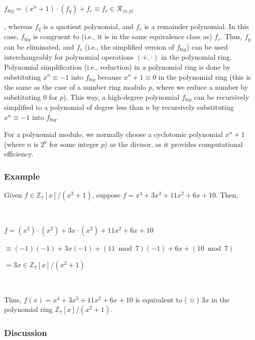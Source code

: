 $f_{big} = (x^n + 1)\cdot(f_q) + f_r \equiv f_r \in \mathcal{R}_{\langle n, p \rangle}$

\noindent, whereas $f_q$ is a quotient polynomial, and $f_r$ is a remainder polynomial. In this case, $f_{big}$ is congruent to (i.e., it is in the same equivalence class as) $f_r$. Thus, $f_q$ can be eliminated, and $f_r$ (i.e., the simplified version of $f_{big}$) can be used interchangeably for polynomial operations $(+, \cdot)$ in the polynomial ring. 
Polynomial simplification (i.e., reduction) in a polynomial ring is done by substituting $x^n \equiv -1$ into $f_{big}$ because $x^n + 1 \equiv 0$ in the polynomial ring (this is the same as the case of a number ring modulo $p$, where we reduce a number by substituting $0$ for $p$). This way, a high-degree polynomial $f_{big}$ can be recursively simplified to a polynomial of degree less than $n$ by recursively substituting $x^n \equiv -1$ into $f_{big}$.

For a polynomial modulo, we normally choose a cyclotomic polynomial $x^n + 1$ (where $n$ is $2^p$ for some integer $p$) as the divisor, as it provides computational efficiency. 

\subsubsection{Example}
\label{subsubsec:poly-ring-ex}
Given $f \in \mathbb{Z}_7[x] / (x^2 + 1)$, suppose $f = x^4 + 3x^3 + 11x^2 + 6x + 10$. Then, 

$ $

$f = (x^2)\cdot(x^2) + 3x\cdot(x^2) + 11x^2 + 6x + 10$ 

$ \equiv (-1)(-1) + 3x(-1) +  (11 \bmod 7)(-1) + 6x + (10 \bmod 7)$

$ = 3x \in \mathbb{Z}_7[x] / (x^2 + 1)$

$ $

\noindent Thus, $f(x) = x^4 + 3x^3 + 11x^2 + 6x + 10$ is equivalent to ($\equiv$) $3x$ in the polynomial ring $\mathbb{Z}_7[x] / (x^2 + 1)$.


\subsubsection{Discussion}
\label{subsubsec:polynomial-ring-discuss}

